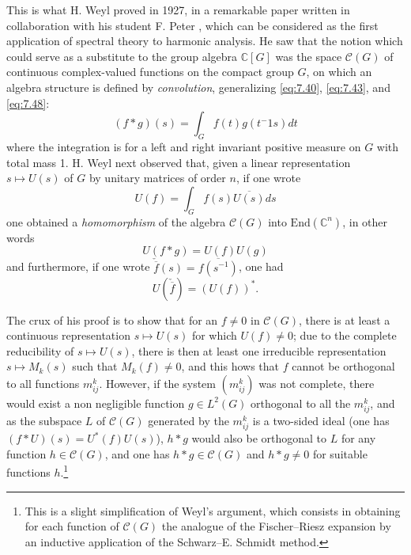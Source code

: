 \documentclass[12pt,a4paper,leqno,twoside]{extbook}
\newcommand{\Cont}{\mathcal{C}}
\newcommand{\C}{\mathbb{C}}
\begin{document}
This is what H. Weyl proved in 1927, in a remarkable paper written in collaboration with his student F. Peter \cite[vol.~III, p.~58--75]{227}, which can be considered as the first application of spectral theory to harmonic analysis. He saw that the notion which could serve as a substitute to the group algebra \(\C[G]\) was the space \(\Cont(G)\) of continuous complex-valued functions on the compact group \(G\), on which an algebra structure is defined by \emph{convolution}, generalizing \eqref{eq:7.40}, \eqref{eq:7.43}, and \eqref{eq:7.48}:
\begin{equation}
    \label{eq:7.58}
    (f * g)(s) = \int_G f(t) g(t^-1 s)dt
\end{equation}
where the integration is for a left and right invariant positive measure on \(G\) with total mass 1. H. Weyl next observed that, given a linear representation \(s \mapsto U(s)\) of \(G\) by unitary matrices of order \(n\), if one wrote
\begin{equation}
    \label{eq:7.59}
    U(f) = \int_G f(s)\overline{U(s)}ds
\end{equation}
one obtained a \emph{homomorphism} of the algebra \(\Cont(G)\) into \(\text{End}(\C^n)\), in other words
\begin{equation}
    \label{eq:7.60}
    U(f * g) = U(f) U(g)
\end{equation}
and furthermore, if one wrote \(\check{\overline{f}}(s) = \overline{f(s^{-1})}\), one had
\begin{equation}
    \label{eq:7.61}
    U(\check{\overline{f}}) = (U(f))^*.
\end{equation}

The crux of his proof is to show that for an \(f \neq 0\) in \(\Cont(G)\), there is at least a continuous representation \(s \mapsto U(s)\) for which \(U(f) \neq 0\); due to the complete reducibility of \(s \mapsto U(s)\), there is then at least one irreducible representation \(s \mapsto M_k(s)\) such that \(M_k(f) \neq 0\), and this hows that \(f\) cannot be orthogonal to all functions \(m^k_{ij}\). However, if the system \((m^k_{ij})\) was not complete, there would exist a non negligible function \(g \in L^2(G)\) orthogonal to all the \(m^k_{ij}\), and as the subspace \(L\) of \(\Cont(G)\) generated by the \(m^k_{ij}\) is a two-sided ideal (one has \((f*U)(s) = U^*(f)U(s)\)), \(h*g\) would also be orthogonal to \(L\) for any function \(h \in \Cont(G)\), and one has \(h*g \in \Cont(G)\) and \(h*g \neq 0\) for suitable functions \(h\).\footnote{This is a slight simplification of Weyl's argument, which consists in obtaining for each function of \(\Cont(G)\) the analogue of the Fischer--Riesz expansion by an inductive application of the Schwarz--E. Schmidt method.}
\end{document}
